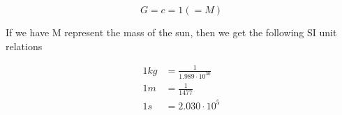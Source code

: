 \documentclass{article}
\begin{document}
\begin{equation}
    G = c = 1 \left(=M\right)
\end{equation}

If we have M represent the mass of the sun, then we get the following SI unit relations

\begin{align*}
    1kg &= \frac{1}{1.989 \cdot 10^{30}} \\
    1m &= \frac{1}{1477} \\
    1s &= 2.030 \cdot 10^5
\end{align*}



    





\end{document}
